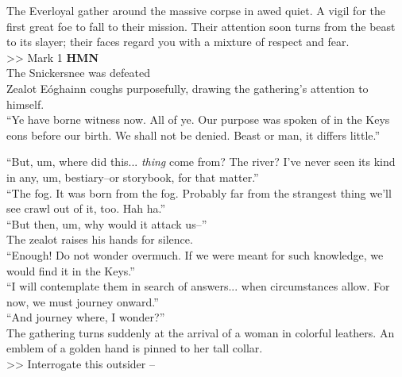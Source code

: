 The Everloyal gather around the massive corpse in awed quiet. A vigil for the first great foe to fall to their mission. Their attention soon turns from the beast to its slayer; their faces regard you with a mixture of respect and fear.\\
>> Mark 1 \textbf{HMN}\\
 The Snickersnee was defeated\\

Zealot Eóghainn coughs purposefully, drawing the gathering’s attention to himself.\\

“Ye have borne witness now. All of ye. Our purpose was spoken of in the Keys eons before our birth. We shall not be denied. Beast or man, it differs little.”

“But, um, where did this... \emph{thing} come from? The river? I’ve never seen its kind in any, um, bestiary--or storybook, for that matter.”\\

“The fog. It was born from the fog. Probably far from the strangest thing we’ll see crawl out of it, too. Hah ha.”\\

“But then, um, why would it attack us--”\\

The zealot raises his hands for silence.\\
“Enough! Do not wonder overmuch. If we were meant for such knowledge, we would find it in the Keys.”\\

“I will contemplate them in search of answers... when circumstances allow. For now, we must journey onward.”\\

“And journey where, I wonder?”\\

The gathering turns suddenly at the arrival of a woman in colorful leathers. An emblem of a golden hand is pinned to her tall collar.\\

>> Interrogate this outsider -- 